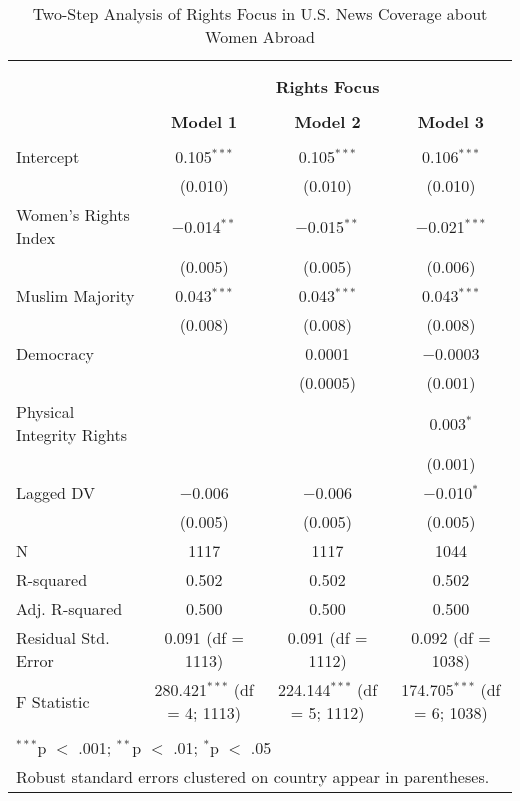 
\begin{table}[!htbp] \centering 
  \caption{Two-Step Analysis of Rights Focus in U.S. News Coverage about Women Abroad} 
  \label{table:heckit} 
\begin{tabular}{@{\extracolsep{5pt}}lccc} 
\\[-1.8ex]\hline \\[-1.8ex] 
\\[-1.8ex] & \multicolumn{3}{c}{\textbf{Rights Focus}} \\ 
\\[-1.8ex] & \textbf{Model 1} & \textbf{Model 2} & \textbf{Model 3}\\ 
\hline \\[-1.8ex] 
 Intercept & 0.105$^{***}$ & 0.105$^{***}$ & 0.106$^{***}$ \\ 
  & (0.010) & (0.010) & (0.010) \\ 
  Women's Rights Index & $-$0.014$^{**}$ & $-$0.015$^{**}$ & $-$0.021$^{***}$ \\ 
  & (0.005) & (0.005) & (0.006) \\ 
  Muslim Majority & 0.043$^{***}$ & 0.043$^{***}$ & 0.043$^{***}$ \\ 
  & (0.008) & (0.008) & (0.008) \\ 
  Democracy &  & 0.0001 & $-$0.0003 \\ 
  &  & (0.0005) & (0.001) \\ 
  Physical Integrity Rights &  &  & 0.003$^{*}$ \\ 
  &  &  & (0.001) \\ 
  Lagged DV & $-$0.006 & $-$0.006 & $-$0.010$^{*}$ \\ 
  & (0.005) & (0.005) & (0.005) \\ 
 N & 1117 & 1117 & 1044 \\ 
R-squared & 0.502 & 0.502 & 0.502 \\ 
Adj. R-squared & 0.500 & 0.500 & 0.500 \\ 
Residual Std. Error & 0.091 (df = 1113) & 0.091 (df = 1112) & 0.092 (df = 1038) \\ 
F Statistic & 280.421$^{***}$ (df = 4; 1113) & 224.144$^{***}$ (df = 5; 1112) & 174.705$^{***}$ (df = 6; 1038) \\ 
\hline \\[-1.8ex] 
\multicolumn{4}{l}{$^{***}$p $<$ .001; $^{**}$p $<$ .01; $^{*}$p $<$ .05} \\ 
\multicolumn{4}{l}{Robust standard errors clustered on country appear in parentheses.} \\ 
\end{tabular} 
\end{table} 

